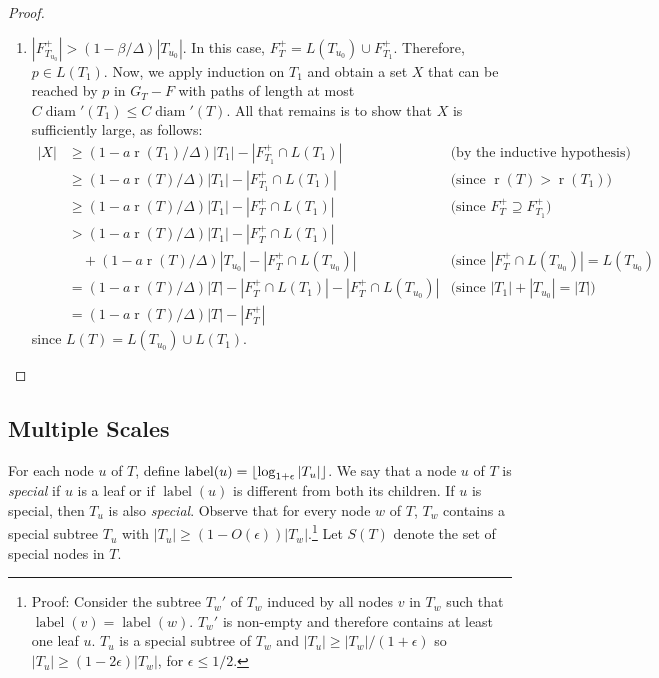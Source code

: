 \documentclass{patmorin}
\DeclareMathOperator{\rank}{r}
\DeclareMathOperator{\diam}{diam}
\DeclareMathOperator{\lbl}{label}
\begin{document}
\begin{proof}
\begin{enumerate}
    \item $|F^+_{T_{u_0}}|> (1-\beta/\Delta)|T_{u_0}|$.  In this case,
      $F^+_T= L(T_{u_0})\cup F^+_{T_1}$.  Therefore, $p\in L(T_1)$.
      Now, we apply induction on $T_1$ and obtain a set $X$ that can be
      reached by $p$ in $G_T-F$ with paths of length at most $C\diam'(T_1)\le
      C\diam'(T)$.  All that remains is to show that $X$ is sufficiently
      large, as follows:
  \begin{align*}
    |X| & \ge (1-a\rank(T_1)/\Delta)|T_1|-|F^+_{T_1} \cap L(T_1)| &
       \text{(by the inductive hypothesis)} \\
    & \ge (1-a\rank(T)/\Delta)|T_1|-|F^+_{T_1} \cap L(T_1)| 
     & \text{(since $\rank(T)>\rank(T_1)$)} \\
    & \ge (1-a\rank(T)/\Delta)|T_1|-|F^+_{T} \cap L(T_1)| 
    & \text{(since $F^+_T\supseteq F^+_{T_1}$)} \\
    & > (1-a\rank(T)/\Delta)|T_1|-|F^+_{T} \cap L(T_1)| \\
     & \quad {} + (1-a\rank(T)/\Delta)|T_{u_0}|-|F^+_{T}\cap L(T_{u_0})|
    & \text{(since $|F^+_T \cap L(T_{u_0})|=L(T_{u_0})$} \\
    & = (1-a\rank(T)/\Delta)|T|-|F^+_{T}\cap L(T_1)| - |F^+_T\cap L(T_{u_0})|
    & \text{(since $|T_1|+|T_{u_0}|=|T|$)} \\
    & = (1-a\rank(T)/\Delta)|T|-|F^+_{T}|  
  \end{align*}
  since $L(T)=L(T_{u_0})\cup L(T_1)$.
  \end{enumerate}
\end{proof}

\subsection{Multiple Scales}

For each node $u$ of $T$, define
$\lbl(u)=\floor{\log_{1+\epsilon}|T_u|}$. We say that a node $u$ of $T$
is \emph{special} if $u$ is a leaf or if $\lbl(u)$ is different from both
its children.  If $u$ is special, then $T_u$ is also \emph{special}.
Observe that for every node $w$ of $T$, $T_w$ contains a special
subtree $T_u$ with $|T_u|\ge (1-O(\epsilon))|T_w|$.\footnote{Proof:
Consider the subtree $T_w'$ of $T_w$ induced by all nodes $v$ in $T_w$
such that $\lbl(v)=\lbl(w)$. $T_w'$ is non-empty and therefore contains
at least one leaf $u$. $T_u$ is a special subtree of $T_w$ and $|T_u|\ge
|T_w|/(1+\epsilon)$ so $|T_u|\ge (1-2\epsilon)|T_w|$, for $\epsilon \le
1/2$.}  Let $S(T)$ denote the set of special nodes in $T$.
\end{document}
